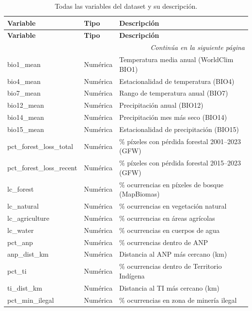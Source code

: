\documentclass[12pt,a4paper]{article}
\begin{document}
\begin{longtable}{p{4.5cm}p{1.8cm}p{6.5cm}}
  \caption{Todas las variables del dataset y su descripción.} \label{tab:all_features} \\
  \toprule
  \textbf{Variable} & \textbf{Tipo} & \textbf{Descripción} \\
  \midrule
  \endfirsthead
  \toprule
  \textbf{Variable} & \textbf{Tipo} & \textbf{Descripción} \\
  \midrule
  \endhead
  \midrule
  \multicolumn{3}{r}{\textit{Continúa en la siguiente página}} \\
  \endfoot
  \bottomrule
  \endlastfoot
  bio1\_mean          & Numérica & Temperatura media anual (WorldClim BIO1) \\
  bio4\_mean          & Numérica & Estacionalidad de temperatura (BIO4) \\
  bio7\_mean          & Numérica & Rango de temperatura anual (BIO7) \\
  bio12\_mean         & Numérica & Precipitación anual (BIO12) \\
  bio14\_mean         & Numérica & Precipitación mes más seco (BIO14) \\
  bio15\_mean         & Numérica & Estacionalidad de precipitación (BIO15) \\
  pct\_forest\_loss\_total  & Numérica & \% píxeles con pérdida forestal 2001--2023 (GFW) \\
  pct\_forest\_loss\_recent & Numérica & \% píxeles con pérdida forestal 2015--2023 (GFW) \\
  lc\_forest          & Numérica & \% ocurrencias en píxeles de bosque (MapBiomas) \\
  lc\_natural         & Numérica & \% ocurrencias en vegetación natural \\
  lc\_agriculture     & Numérica & \% ocurrencias en áreas agrícolas \\
  lc\_water           & Numérica & \% ocurrencias en cuerpos de agua \\
  pct\_anp            & Numérica & \% ocurrencias dentro de ANP \\
  anp\_dist\_km       & Numérica & Distancia al ANP más cercano (km) \\
  pct\_ti             & Numérica & \% ocurrencias dentro de Territorio Indígena \\
  ti\_dist\_km        & Numérica & Distancia al TI más cercano (km) \\
  pct\_min\_ilegal    & Numérica & \% ocurrencias en zona de minería ilegal \\

\end{longtable}
\end{document}
